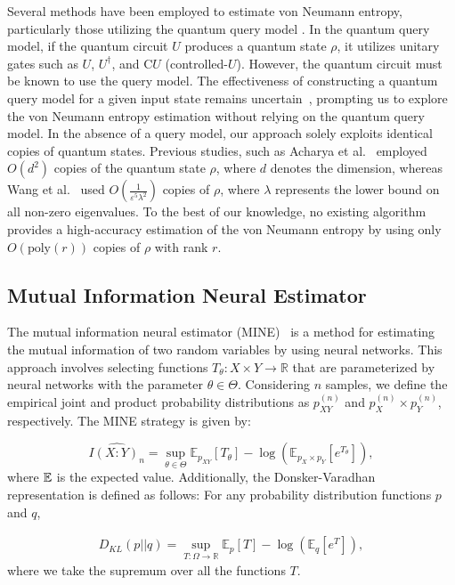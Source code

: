 \documentclass[aps,groupedaddress,superscriptaddress,amssymb,amsmath,amsbsy,amsfonts,twocolumn,pra]{revtex4}
\begin{document}
Several methods have been employed to estimate von Neumann entropy, particularly those utilizing the quantum query model \cite{WZW22, GL19, SH21}. In the quantum query model, if the quantum circuit $U$ produces a quantum state $\rho$, it utilizes unitary gates such as $U$, $U^{\dagger}$, and C$U$ (controlled-$U$). However, the quantum circuit must be known to use the query model. The effectiveness of constructing a quantum query model for a given input state remains uncertain~\cite{WZW22}, prompting us to explore the von Neumann entropy estimation without relying on the quantum query model. In the absence of a query model, our approach solely exploits identical copies of quantum states. Previous studies, such as Acharya et al.~\cite{AISW20} employed $O(d^2)$ copies of the quantum state $\rho$, where $d$ denotes the dimension, whereas Wang et al.~\cite{WZW22} used $O\left(\frac{1}{\varepsilon^{5}\lambda^{2}}\right)$ copies of $\rho$, where $\lambda$ represents the lower bound on all non-zero eigenvalues. To the best of our knowledge, no existing algorithm provides a high-accuracy estimation of the von Neumann entropy by using only $O(\text{poly}(r))$ copies of $\rho$ with rank $r$.

\subsection{Mutual Information Neural Estimator}
The mutual information neural estimator (MINE)~\cite{BBR+18} is a method for estimating the mutual information of two random variables by using neural networks. This approach involves selecting functions $T_{\theta}: X \times Y \rightarrow \mathbb{R}$ that are parameterized by neural networks with the parameter $\theta \in \Theta$. Considering $n$ samples, we define the empirical joint and product probability distributions as $p_{XY}^{(n)}$ and $p_X^{(n)} \times p_Y^{(n)}$, respectively. The MINE strategy is given by:

\begin{equation} \label{eq:nim}
\widehat{I(X:Y)_n} = \sup_{\theta \in \Theta} \mathbb{E}_{p_{XY}}\left[T_{\theta}\right]-\log\left(\mathbb{E}_{p_X \times p_Y}\left[e^{T_{\theta}}\right]\right),
\end{equation} 
where ${\mathbb{E}}$ is the expected value. Additionally, the Donsker-Varadhan representation is defined as follows: For any probability distribution functions $p$ and $q$,

\begin{align}
D_{KL}(p||q) = \sup_{T: \Omega \rightarrow \mathbb{R}} \mathbb{E}_p[T]-\log\left(\mathbb{E}_q\left[e^T\right]\right),
\end{align}
where we take the supremum over all the functions $T$.
\end{document}
